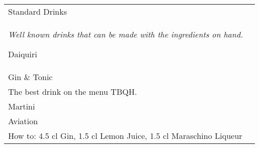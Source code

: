 \documentclass[12pt]{article}
\makeatletter
\newcommand*\ColText[1]{\textcolor{DarkColor}{#1}}
\newenvironment{Group}[1]
  {\noindent\begin{tabular*}{\textwidth}{@{}p{.8\linewidth}@{\extracolsep{\fill}}r@{}}
    {\fontsize{24}{29}\selectfont\ColText{#1}}\\[0.8em]}
  {\end{tabular*}}
\newcommand*\Entry[1]{%
  \sffamily#1 \\
}
\newcommand*\Expl[1]{
  \hspace*{1em}\footnotesize #1 \\
}
\newcommand*\HowTo[1]{
  \hspace*{1em}\footnotesize How to: \hspace*{1em}#1 \\
}
\makeatother
\begin{document}
\vfill

\begin{Group}{Standard Drinks}
\emph{Well known drinks that can be made with the ingredients on hand.}


\Entry{Daiquiri}
\Entry{Gin \& Tonic}
\Expl{The best drink on the menu TBQH.}
\Entry{Martini}

\Entry{Aviation}
\HowTo{4.5 cl Gin, 1.5 cl Lemon Juice, 1.5 cl Maraschino Liqueur}

\end{Group}
\end{document}
